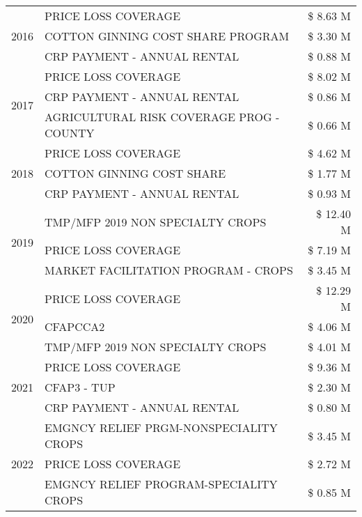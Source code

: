 \begin{tabular}{llr}
\cline{1-3}
\multirow[t]{3}{*}{2016} & PRICE LOSS COVERAGE & \$ 8.63 M \\
 & COTTON GINNING COST SHARE PROGRAM & \$ 3.30 M \\
 & CRP PAYMENT - ANNUAL RENTAL & \$ 0.88 M \\
\cline{1-3}
\multirow[t]{3}{*}{2017} & PRICE LOSS COVERAGE & \$ 8.02 M \\
 & CRP PAYMENT - ANNUAL RENTAL & \$ 0.86 M \\
 & AGRICULTURAL RISK COVERAGE PROG - COUNTY & \$ 0.66 M \\
\cline{1-3}
\multirow[t]{3}{*}{2018} & PRICE LOSS COVERAGE & \$ 4.62 M \\
 & COTTON GINNING COST SHARE & \$ 1.77 M \\
 & CRP PAYMENT - ANNUAL RENTAL & \$ 0.93 M \\
\cline{1-3}
\multirow[t]{3}{*}{2019} & TMP/MFP 2019 NON SPECIALTY CROPS & \$ 12.40 M \\
 & PRICE LOSS COVERAGE & \$ 7.19 M \\
 & MARKET FACILITATION PROGRAM - CROPS & \$ 3.45 M \\
\cline{1-3}
\multirow[t]{3}{*}{2020} & PRICE LOSS COVERAGE & \$ 12.29 M \\
 & CFAPCCA2 & \$ 4.06 M \\
 & TMP/MFP 2019 NON SPECIALTY CROPS & \$ 4.01 M \\
\cline{1-3}
\multirow[t]{3}{*}{2021} & PRICE LOSS COVERAGE & \$ 9.36 M \\
 & CFAP3 - TUP & \$ 2.30 M \\
 & CRP PAYMENT - ANNUAL RENTAL & \$ 0.80 M \\
\cline{1-3}
\multirow[t]{3}{*}{2022} & EMGNCY RELIEF PRGM-NONSPECIALITY CROPS & \$ 3.45 M \\
 & PRICE LOSS COVERAGE & \$ 2.72 M \\
 & EMGNCY RELIEF PROGRAM-SPECIALITY CROPS & \$ 0.85 M \\
\cline{1-3}
\bottomrule
\end{tabular}
